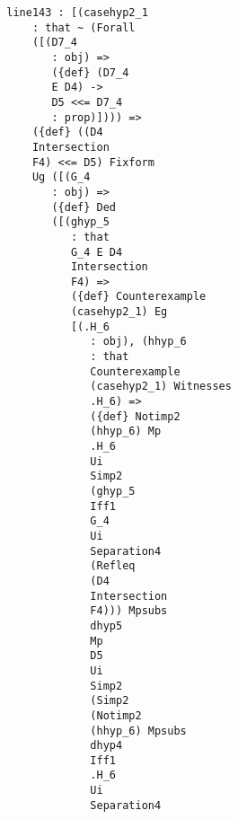 \documentclass[12pt]{article}
\begin{document}
\begin{verbatim}
                           line143 : [(casehyp2_1 
                               : that ~ (Forall 
                               ([(D7_4 
                                  : obj) => 
                                  ({def} (D7_4 
                                  E D4) -> 
                                  D5 <<= D7_4 
                                  : prop)]))) => 
                               ({def} ((D4 
                               Intersection 
                               F4) <<= D5) Fixform 
                               Ug ([(G_4 
                                  : obj) => 
                                  ({def} Ded 
                                  ([(ghyp_5 
                                     : that 
                                     G_4 E D4 
                                     Intersection 
                                     F4) => 
                                     ({def} Counterexample 
                                     (casehyp2_1) Eg 
                                     [(.H_6 
                                        : obj), (hhyp_6 
                                        : that 
                                        Counterexample 
                                        (casehyp2_1) Witnesses 
                                        .H_6) => 
                                        ({def} Notimp2 
                                        (hhyp_6) Mp 
                                        .H_6 
                                        Ui 
                                        Simp2 
                                        (ghyp_5 
                                        Iff1 
                                        G_4 
                                        Ui 
                                        Separation4 
                                        (Refleq 
                                        (D4 
                                        Intersection 
                                        F4))) Mpsubs 
                                        dhyp5 
                                        Mp 
                                        D5 
                                        Ui 
                                        Simp2 
                                        (Simp2 
                                        (Notimp2 
                                        (hhyp_6) Mpsubs 
                                        dhyp4 
                                        Iff1 
                                        .H_6 
                                        Ui 
                                        Separation4 

\end{verbatim}
\end{document}
